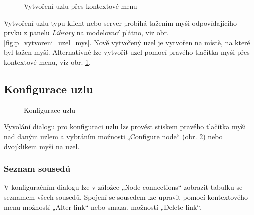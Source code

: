 \documentclass[czech,DP]{thesiskiv}
\begin{document}
\begin{figure}
\centering
\caption{Vytvoření uzlu přes kontextové menu}
\label{fig:p_vytvoreni_uzel_kontext}
\end{figure}

Vytvoření uzlu typu klient nebo server probíhá tažením myši odpovídajícího prvku z panelu \textit{Library} na modelovací plátno, viz obr. \ref{fig:p_vytvoreni_uzel_mys}. Nově vytvořený uzel je vytvořen na místě, na které byl tažen myší. Alternativně lze vytvořit uzel pomocí pravého tlačítka myši přes kontextové menu, viz obr. \ref{fig:p_vytvoreni_uzel_kontext}.

\subsection{Konfigurace uzlu}

\begin{figure}
\centering
\caption{Konfigurace uzlu}
\label{fig:p_konfigurace_uzel}
\end{figure}

Vyvolání dialogu pro konfiguraci uzlu lze provést stiskem pravého tlačítka myši nad daným uzlem a vybráním možnosti „Configure node“ (obr. \ref{fig:p_konfigurace_uzel}) nebo dvojklikem myší na uzel.

\subsubsection*{Seznam sousedů}

V konfiguračním dialogu lze v záložce „Node connections“ zobrazit tabulku se seznamem všech sousedů. Spojení se sousedem lze upravit pomocí kontextového menu možností „Alter link“ nebo smazat možností „Delete link“.
\end{document}
